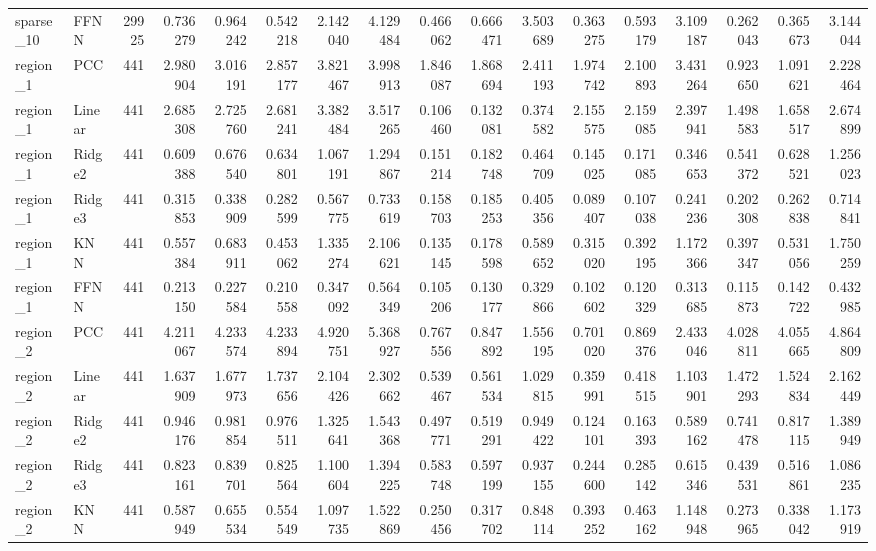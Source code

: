 \begin{tabular}{llrrrrrrrrrrrrrrr}
sparse_10 & FFNN & 29925 & 0.736279 & 0.964242 & 0.542218 & 2.142040 & 4.129484 & 0.466062 & 0.666471 & 3.503689 & 0.363275 & 0.593179 & 3.109187 & 0.262043 & 0.365673 & 3.144044 \\
region_1 & PCC & 441 & 2.980904 & 3.016191 & 2.857177 & 3.821467 & 3.998913 & 1.846087 & 1.868694 & 2.411193 & 1.974742 & 2.100893 & 3.431264 & 0.923650 & 1.091621 & 2.228464 \\
region_1 & Linear & 441 & 2.685308 & 2.725760 & 2.681241 & 3.382484 & 3.517265 & 0.106460 & 0.132081 & 0.374582 & 2.155575 & 2.159085 & 2.397941 & 1.498583 & 1.658517 & 2.674899 \\
region_1 & Ridge2 & 441 & 0.609388 & 0.676540 & 0.634801 & 1.067191 & 1.294867 & 0.151214 & 0.182748 & 0.464709 & 0.145025 & 0.171085 & 0.346653 & 0.541372 & 0.628521 & 1.256023 \\
region_1 & Ridge3 & 441 & 0.315853 & 0.338909 & 0.282599 & 0.567775 & 0.733619 & 0.158703 & 0.185253 & 0.405356 & 0.089407 & 0.107038 & 0.241236 & 0.202308 & 0.262838 & 0.714841 \\
region_1 & KNN & 441 & 0.557384 & 0.683911 & 0.453062 & 1.335274 & 2.106621 & 0.135145 & 0.178598 & 0.589652 & 0.315020 & 0.392195 & 1.172366 & 0.397347 & 0.531056 & 1.750259 \\
region_1 & FFNN & 441 & 0.213150 & 0.227584 & 0.210558 & 0.347092 & 0.564349 & 0.105206 & 0.130177 & 0.329866 & 0.102602 & 0.120329 & 0.313685 & 0.115873 & 0.142722 & 0.432985 \\
region_2 & PCC & 441 & 4.211067 & 4.233574 & 4.233894 & 4.920751 & 5.368927 & 0.767556 & 0.847892 & 1.556195 & 0.701020 & 0.869376 & 2.433046 & 4.028811 & 4.055665 & 4.864809 \\
region_2 & Linear & 441 & 1.637909 & 1.677973 & 1.737656 & 2.104426 & 2.302662 & 0.539467 & 0.561534 & 1.029815 & 0.359991 & 0.418515 & 1.103901 & 1.472293 & 1.524834 & 2.162449 \\
region_2 & Ridge2 & 441 & 0.946176 & 0.981854 & 0.976511 & 1.325641 & 1.543368 & 0.497771 & 0.519291 & 0.949422 & 0.124101 & 0.163393 & 0.589162 & 0.741478 & 0.817115 & 1.389949 \\
region_2 & Ridge3 & 441 & 0.823161 & 0.839701 & 0.825564 & 1.100604 & 1.394225 & 0.583748 & 0.597199 & 0.937155 & 0.244600 & 0.285142 & 0.615346 & 0.439531 & 0.516861 & 1.086235 \\
region_2 & KNN & 441 & 0.587949 & 0.655534 & 0.554549 & 1.097735 & 1.522869 & 0.250456 & 0.317702 & 0.848114 & 0.393252 & 0.463162 & 1.148948 & 0.273965 & 0.338042 & 1.173919 \\

\end{tabular}
